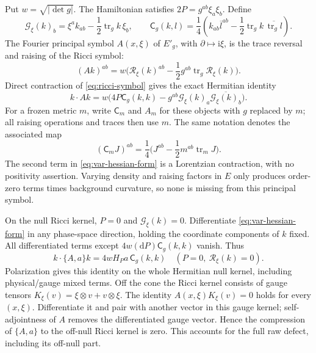 \documentclass[11pt,a4paper]{article}
\numberwithin{equation}{section}
\newcommand{\tr}{\operatorname{tr}}
\newcommand{\dd}{\mathrm d}
\newcommand{\f}[2]{\frac{#1}{#2}}
\newcommand{\ii}{\mathrm{i}}
\theoremstyle{definition}
\begin{document}
Put $w=\sqrt{|\det g|}$. The Hamiltonian satisfies
$2P=g^{ab}\xi_a\xi_b$. Define
\begin{equation*}
\mathcal G_\xi(k)_b=\xi^ak_{ab}-\f12\tr_gk\,\xi_b,\qquad
\mathsf C_g(k,l)=\f14(k_{ab}\overline l^{ab}
                       -\f12\tr_gk\,\overline{\tr_gl}).
\end{equation*}
The Fourier principal symbol $A(x,\xi)$ of $E'_g$, with
$\partial\mapsto \ii \xi$, is the trace reversal and raising of the Ricci
symbol:
\begin{equation*}
(Ak)^{ab}=w\bigl(\mathcal R_\xi(k)^{ab}
                  -\f12g^{ab}\tr_g\mathcal R_\xi(k)\bigr).
\end{equation*}
Direct contraction of \eqref{eq:ricci-symbol} gives the exact Hermitian
identity
\begin{equation}\label{eq:var-hessian-form}
k\cdot Ak
=w\bigl(4P\mathsf C_g(k,k)
        -g^{ab}\mathcal G_\xi(k)_a
                    \overline{\mathcal G_\xi(k)_b}\bigr).
\end{equation}
For a frozen metric $m$, write $\mathsf C_m$ and $A_m$ for these
objects with $g$ replaced by $m$; all raising operations and traces
then use $m$. The same notation denotes the associated map
\begin{equation*}
(\mathsf C_m J)^{ab}=\f14
\bigl(J^{ab}-\f12m^{ab}\tr_mJ\bigr).
\end{equation*}
The second term in \eqref{eq:var-hessian-form} is a Lorentzian
contraction, with no positivity assertion.
Varying density and raising factors in $E$ only produces order-zero terms
times background curvature, so none is missing from this principal symbol.

On the null Ricci kernel, $P=0$ and $\mathcal G_\xi(k)=0$.
Differentiate \eqref{eq:var-hessian-form} in any phase-space direction,
holding the coordinate components of $k$ fixed. All differentiated terms
except $4w(\dd P)\mathsf C_g(k,k)$ vanish. Thus
\begin{equation*}
k\cdot\{A,a\}k=4w H_Pa\,\mathsf C_g(k,k)
\quad(P=0,\ \mathcal R_\xi(k)=0).
\end{equation*}
Polarization gives this identity on the whole Hermitian null kernel,
including physical/gauge mixed terms. Off the cone the Ricci kernel
consists of gauge tensors $K_\xi(v)=\xi\otimes v+v\otimes\xi$.
The identity $A(x,\xi)K_\xi(v)=0$ holds for every $(x,\xi)$.
Differentiate it and pair with another vector in this gauge kernel;
self-adjointness of $A$ removes the differentiated gauge vector. Hence
the compression of $\{A,a\}$ to the off-null Ricci kernel is zero.
This accounts for the full raw defect, including its off-null part.
\end{document}
